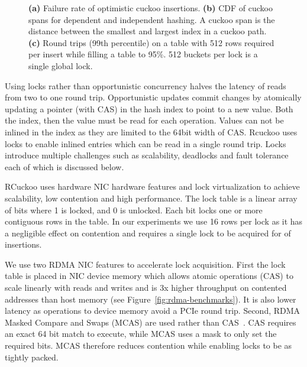 \begin{figure}[t]
\begin{subfigure}{0.3\linewidth}
    \end{subfigure}
    \vspace{-1em}
    \caption{
    \textbf{(a)} Failure rate of optimistic cuckoo insertions.
    \textbf{(b)} CDF of cuckoo spans for dependent and independent hashing. A cuckoo span is the distance between the smallest and largest index in a cuckoo path.
    \textbf{(c)} Round trips (99th percentile) on a table
    with 512 rows required per insert while filling a table
    to 95\%. 512 buckets per lock is a single global lock.}

    \label{fig:cuckoo-problems}

\end{figure}

Using locks rather than opportunistic concurrency halves the
latency of reads from two to one round trip. Opportunistic
updates commit changes by atomically updating a pointer
(with CAS) in the hash index to point to a new value. Both
the index, then the value must be read for each operation.
Values can not be inlined in the index as they are limited
to the 64bit width of CAS. Rcuckoo uses locks to enable
inlined entries which can be read in a single round trip.
Locks introduce multiple challenges such as scalability,
deadlocks and fault tolerance each of which is discussed
below.

RCuckoo uses hardware NIC hardware features and lock
virtualization to achieve scalability, low contention and
high performance. The lock table is a linear array of bits
where 1 is locked, and 0 is unlocked. Each bit locks one or
more contiguous rows in the table. In our experiments we use
16 rows per lock as it has a negligible effect on contention
and requires a single lock to be acquired for  of insertions.

We use two RDMA NIC features to accelerate lock
acquisition. First the lock table is placed in NIC device
memory which allows atomic operations (CAS) to
scale linearly with reads and writes and is 3x higher
throughput on contented addresses than host memory (see
Figure~\ref{fig:rdma-benchmarks}). It is also lower latency
as operations to device memory avoid a PCIe round trip.
Second, RDMA Masked Compare and Swaps (MCAS) are used rather
than CAS~\cite{rdma-masked-cas,sherman}. CAS requires an
exact 64 bit match to execute, while MCAS uses a mask to
only set the required bits. MCAS therefore reduces
contention while enabling locks to be as tightly packed.

